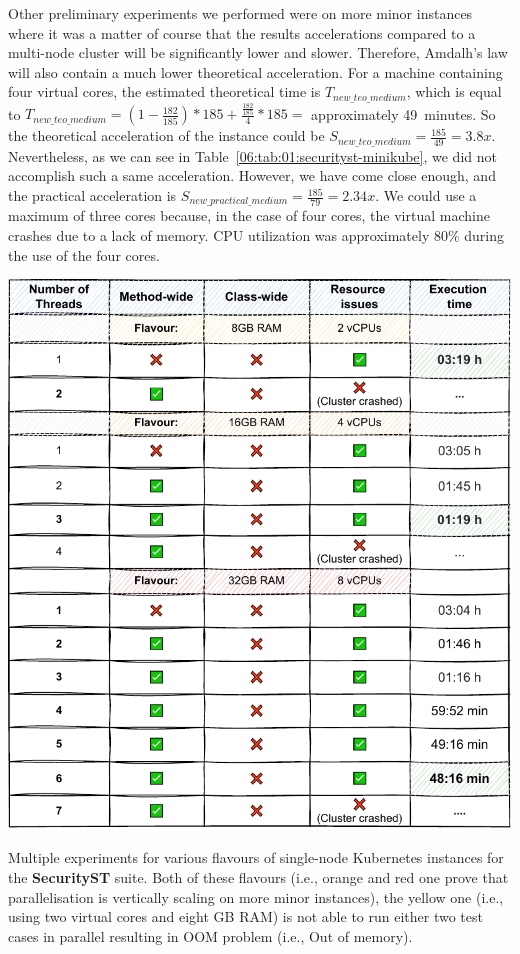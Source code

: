 Other preliminary experiments we performed were on more minor instances where it was a matter of course that the results
accelerations compared to a multi-node cluster will be significantly lower and slower.
Therefore, Amdalh's law will also contain a much lower theoretical acceleration.
For a machine containing four virtual cores, the estimated theoretical time is $T_{new\_teo\_medium}$, which is equal to
$T_{new\_teo\_medium} = (1 - \frac{182}{185}) * 185 + \frac{\frac{182}{185}} {4} * 185 = $ approximately 49~minutes.
So the theoretical acceleration of the instance could be $S_{new\_teo\_medium} = \frac{185}{49} = 3.8x$.
Nevertheless, as we can see in Table~\ref{06:tab:01:securityst-minikube}, we did not accomplish such a same acceleration.
However, we have come close enough, and the practical acceleration is $S_{new\_practical\_medium} = \frac{185}{79} = 2.34x$.
We could use a maximum of three cores because, in the case of four cores, the virtual machine crashes due to a lack of memory.
CPU utilization was approximately 80\% during the use of the four cores.
\begin{table}[ht!]
    \centering
    \includegraphics[scale=0.8]{obrazky-figures/08-experiments/06-exp-preliminary-minikube-b}
    \caption{Multiple experiments for various flavours of single-node Kubernetes instances for the
    \textbf{SecurityST} suite. Both of these flavours (i.e., orange and red one prove that parallelisation is
    vertically scaling on more minor instances), the yellow one (i.e., using two virtual cores and eight GB RAM)
        is not able to run either two test cases in parallel resulting in OOM problem (i.e., Out of memory).}
    \label{06:tab:01:security-st-minikube}
\end{table}

